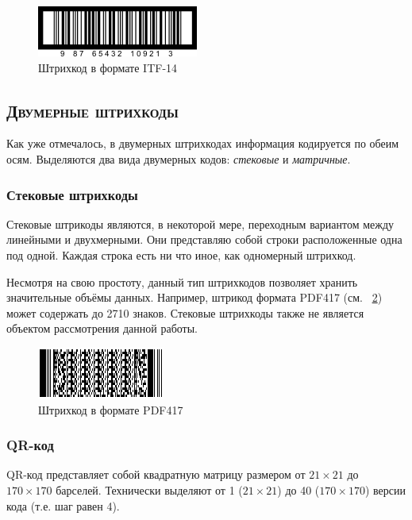 \begin{figure}[h]
    \centering
    \includegraphics[scale=0.7]{img/itf_sample}
    \caption{Штрихкод в формате ITF-14}
    \label{fig:itf14}
\end{figure}
    
\subsection{\textsc{Двумерные штрихкоды}}

Как уже отмечалось, в двумерных штрихкодах информация кодируется
по обеим осям. Выделяются два вида двумерных кодов: \textit{стековые}
и \textit{матричные}.

\subsubsection{Стековые штрихкоды}  
Стековые штрикоды являются, в некоторой мере, переходным вариантом
между линейными и двухмерными. Они представляю собой строки расположенные
одна под одной. Каждая строка есть ни что иное, как одномерный штрихкод.

Несмотря на свою простоту, данный тип штрихкодов позволяет хранить 
значительные объёмы данных. Например, штрикод формата PDF417 
(см. \figurename\ \ref{fig:pdf417}) может содержать до 2710 знаков.
Стековые штрихкоды также не является объектом рассмотрения данной
работы. 

\begin{figure}[htb]
    \centering
    \includegraphics{img/pdf417_sample}
    \caption{Штрихкод в формате PDF417}
    \label{fig:pdf417}
\end{figure}

\subsubsection{QR-код}

QR-код представляет собой квадратную матрицу размером от $21 \times 21$ до 
$170 \times 170$ барселей. Технически выделяют от 1 ($21 \times 21$) до
40 ($170 \times 170$) версии кода (т.е. шаг равен 4).

